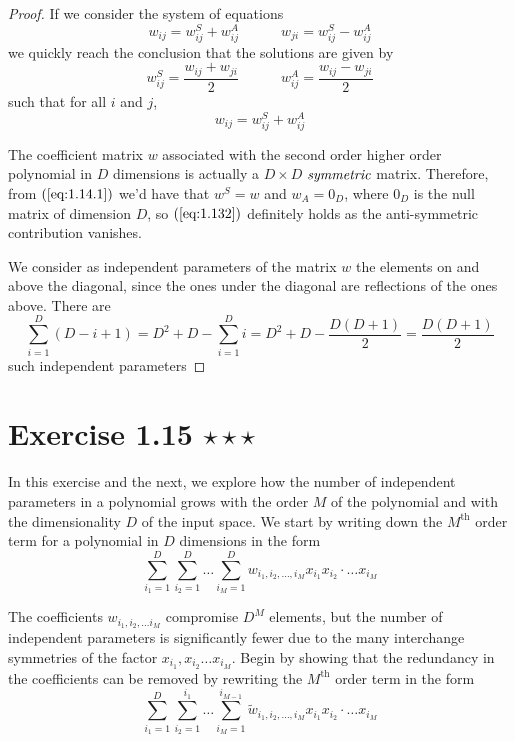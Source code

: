 \vspace{1em}

\begin{proof}
    If we consider the system of equations
    \[
        w_{ij} = w_{ij}^S + w_{ij}^A 
        \hspace{3em}
        w_{ji} = w_{ij}^S - w_{ij}^A
    \]
    we quickly reach the conclusion that the solutions are given by
    \begin{equation}\label{eq:1.14.1}\tag{1.14.1}
        w_{ij}^S = \frac{w_{ij} + w_{ji}}{2}
        \hspace{3em}
        w_{ij}^A = \frac{w_{ij} - w_{ji}}{2}
    \end{equation}
    such that for all $i$ and $j$, 
    \[
        w_{ij} = w_{ij}^S + w_{ij}^A 
    \] 

    The coefficient matrix $w$ associated with the second order higher order polynomial 
    in $D$ dimensions is actually a $D \times D$ $\emph{symmetric}$ matrix. Therefore, from
    $(\ref{eq:1.14.1})$ we'd have that $w^S = w$ and $w_A = 0_D$, where $0_D$ is the null
    matrix of dimension $D$, so $(\ref{eq:1.132})$ definitely holds as the anti-symmetric
    contribution vanishes.

    We consider as independent parameters of the matrix $w$ the elements on and above the diagonal,
    since the ones under the diagonal are reflections of the ones above. There are  
    \[
        \sum_{i=1}^{D} (D - i + 1) = D^2 + D - \sum_{i=1}^{D} i = D^2 + D - \frac{D(D+1)}{2} = \frac{D(D+1)}{2}
    \] 
    such independent parameters
\end{proof}

\section*{Exercise 1.15 $\star \star \star$}
In this exercise and the next, we explore how the number of independent
parameters in a polynomial grows with the order $M$ of the polynomial and with
the dimensionality $D$ of the input space. We start by writing down the $M^{\text{th}}$ order
term for a polynomial in $D$ dimensions in the form
\begin{equation}\label{eq:1.133}\tag{1.133}
    \sum_{i_1=1}^{D} \sum_{i_2=1}^{D} \ldots \sum_{i_M=1}^{D} 
        w_{i_1,i_2,\ldots,i_M}x_{i_1}x_{i_2} \cdot \ldots x_{i_M} 
\end{equation}

The coefficients $w_{i_1, i_2, \ldots i_M}$ compromise $D^M$ elements, but the number
of independent parameters is significantly fewer due to the many interchange symmetries
of the factor $x_{i_1}, x_{i_2} \ldots x_{i_M}$. Begin by showing that the redundancy in the
coefficients can be removed by rewriting the $M^\text{th}$ order term in the form
\begin{equation}\label{eq:1.134}\tag{1.134}
    \sum_{i_1=1}^{D} \sum_{i_2=1}^{i_1} \ldots \sum_{i_M=1}^{i_{M-1}} 
        \widetilde{w}_{i_1,i_2,\ldots,i_M}x_{i_1}x_{i_2} \cdot \ldots x_{i_M} 
\end{equation}

